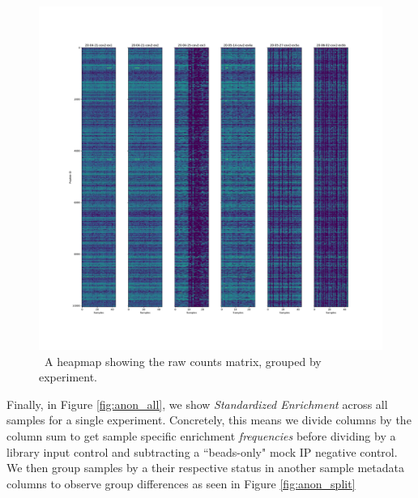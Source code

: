 \documentclass{article}
\begin{document}
\begin{figure}[h!]
    \centering
    \includegraphics[width=1.0\textwidth]{figures/raw_counts.pdf}
    \caption{ \
    A heapmap showing the raw counts matrix, grouped by experiment.
    }
    \label{fig:raw_counts}
\end{figure}

Finally, in Figure \ref{fig:anon_all}, we show \textit{Standardized Enrichment} across all samples for a single experiment.
Concretely, this means we divide columns by the column sum to get sample specific enrichment \textit{frequencies} before dividing 
by a library input control and subtracting a ``beads-only" mock IP negative control.
We then group samples by a their respective status in another sample metadata columns to observe group differences as seen in Figure \ref{fig:anon_split}
\end{document}
